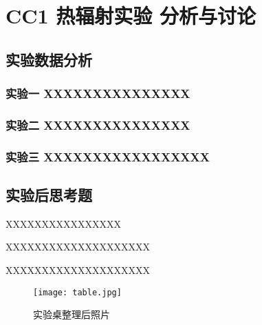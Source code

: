 \documentclass[dvipsnames, svgnames,a4paper,11pt]{article}
\begin{document}
\section{CC1 \quad 热辐射实验 \quad\heiti 分析与讨论}

\subsection{实验数据分析}

	\subsubsection{实验一 \quad XXXXXXXXXXXXXXX}

	



	\subsubsection{实验二 \quad XXXXXXXXXXXXXXX}

	




	\subsubsection{实验三 \quad XXXXXXXXXXXXXXXXX}

	


			
\subsection{实验后思考题}

\begin{question}
	XXXXXXXXXXXXXXXX

\end{question}




\begin{question}
	XXXXXXXXXXXXXXXXXXXX
\end{question}



\begin{question}
	XXXXXXXXXXXXXXXXXXXX
\end{question}





\begin{figure}[H]
	\centering
	\texttt{[image: table.jpg]}
	\caption{实验桌整理后照片}
\end{figure}
	
\end{document}

